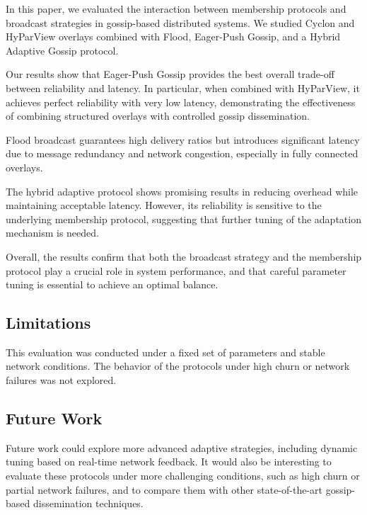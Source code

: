 \documentclass[sigconf,a4paper]{acmart}
\begin{document}
In this paper, we evaluated the interaction between membership protocols
and broadcast strategies in gossip-based distributed systems. We studied
Cyclon and HyParView overlays combined with Flood, Eager-Push Gossip,
and a Hybrid Adaptive Gossip protocol.

Our results show that Eager-Push Gossip provides the best overall trade-off
between reliability and latency. In particular, when combined with
HyParView, it achieves perfect reliability with very low latency,
demonstrating the effectiveness of combining structured overlays with
controlled gossip dissemination.

Flood broadcast guarantees high delivery ratios but introduces significant
latency due to message redundancy and network congestion, especially in
fully connected overlays.

The hybrid adaptive protocol shows promising results in reducing overhead
while maintaining acceptable latency. However, its reliability is sensitive
to the underlying membership protocol, suggesting that further tuning of
the adaptation mechanism is needed.

Overall, the results confirm that both the broadcast strategy and the
membership protocol play a crucial role in system performance, and that
careful parameter tuning is essential to achieve an optimal balance.

\subsection{Limitations}

This evaluation was conducted under a fixed set of parameters and stable
network conditions. The behavior of the protocols under high churn or
network failures was not explored.

\subsection{Future Work}

Future work could explore more advanced adaptive strategies, including
dynamic tuning based on real-time network feedback. It would also be
interesting to evaluate these protocols under more challenging conditions,
such as high churn or partial network failures, and to compare them with
other state-of-the-art gossip-based dissemination techniques.
\end{document}
